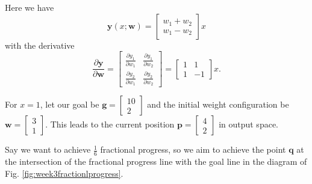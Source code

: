\documentclass{article}
\renewcommand\vec{\mathbf}
\begin{document}
Here we have
\begin{equation*}
    \vec{y}(x; \vec{w}) = 
    \begin{bmatrix}
        w_1 + w_2 \\
        w_1 - w_2
    \end{bmatrix}
    x
\end{equation*}
with the derivative
\begin{equation*}
    \frac{\partial \vec{y}}{\partial \vec{w}}
    =
    \begin{bmatrix}
        \frac{\partial y_1}{\partial w_1} & \frac{\partial y_1}{\partial w_2} \\
        \frac{\partial y_2}{\partial w_1} & \frac{\partial y_2}{\partial w_2}
    \end{bmatrix}
    =
    \begin{bmatrix}
        1 & 1 \\
        1 & -1
    \end{bmatrix}
    x.
\end{equation*}

For
$x = 1$,
let our goal be $\vec{g} = \begin{bmatrix} 10 \\ 2 \end{bmatrix}$
and the initial weight configuration be
$\vec{w} = \begin{bmatrix} 3 \\ 1 \end{bmatrix}$.
This leads to the current position $\vec{p} = \begin{bmatrix} 4 \\ 2 \end{bmatrix}$ in output space.

Say we want to achieve $\frac{1}{6}$ fractional progress, so we aim to achieve the point $\vec{q}$ at the intersection of the fractional progress line with the goal line in the diagram of Fig. \ref{fig:week3fractionlprogress}. 
\end{document}
